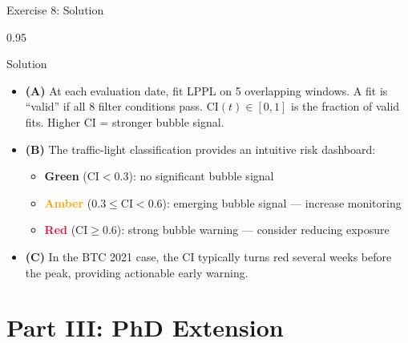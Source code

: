 \documentclass[9pt, aspectratio=169, t]{beamer}
\begin{document}
\begin{frame}{Exercise 8: Solution}
    \begin{cminipage}{0.95\textwidth}
    \begin{exampleblock}{Solution}
        {\small
        \begin{itemize}\setlength{\itemsep}{3pt}
            \item \textcolor{MainBlue}{\textbf{(A)}} At each evaluation date, fit LPPL on 5 overlapping windows. A fit is ``valid'' if all 8 filter conditions pass. $\text{CI}(t) \in [0, 1]$ is the fraction of valid fits. Higher CI = stronger bubble signal.
            \item \textcolor{MainBlue}{\textbf{(B)}} The traffic-light classification provides an intuitive risk dashboard:
                \begin{itemize}\setlength{\itemsep}{0pt}
                    \item \textcolor{Forest}{\textbf{Green}} ($\text{CI} < 0.3$): no significant bubble signal
                    \item \textcolor{Orange}{\textbf{Amber}} ($0.3 \leq \text{CI} < 0.6$): emerging bubble signal --- increase monitoring
                    \item \textcolor{Crimson}{\textbf{Red}} ($\text{CI} \geq 0.6$): strong bubble warning --- consider reducing exposure
                \end{itemize}
            \item \textcolor{MainBlue}{\textbf{(C)}} In the BTC 2021 case, the CI typically turns red several weeks before the peak, providing actionable early warning.
        \end{itemize}
        }
    \end{exampleblock}
    \end{cminipage}
\end{frame}

\section{Part III: PhD Extension}
\end{document}
